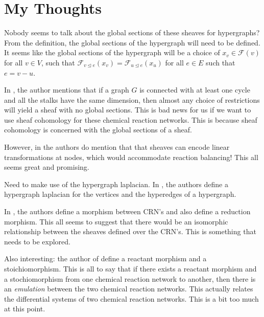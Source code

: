 \documentclass[12pt]{article}
\newcommand{\F}{\mathcal{F}}
\newcommand{\<}{\langle}
\renewcommand{\>}{\rangle}
\begin{document}
\section{My Thoughts}
Nobody seems to talk about the global sections of these sheaves for hypergraphs? 
From the definition, the global sections of the hypergraph will need to be defined.
It seems like the global sections of the hypergraph will be a choice of $x_v \in \F(v)$ for
all $v \in V$, such that $\F_{v \trianglelefteq e}(x_v) = \F_{u \trianglelefteq e}(x_u)$ for all
$e \in E$ such that $e = v - u$.

In \cite{jakobhansen}, the author mentions that if a graph $G$ is connected with at least one cycle
and all the stalks have the same dimension, then almost any choice of restrictions will yield a sheaf 
with no global sections. This is bad news for us if we want to use sheaf cohomology for these chemical
reaction networks. This is because sheaf cohomology is concerned with the global sections of a sheaf.

However, in \cite{flowsheaf} the authors do mention that that sheaves can encode linear transformations
at nodes, which would accommodate reaction balancing! This all seems great and promising.

Need to make use of the hypergraph laplacian. In \cite{jost2018hypergraph}, the authors define
a hypergraph laplacian for the vertices and the hyperedges of a hypergraph.

In \cite{Hirono2021}, the authors define a morphism between CRN's and also define a reduction
morphism. This all seems to suggest that there would be an isomorphic relationship between the
sheaves defined over the CRN's. This is something that needs to be explored.

Also interesting: the author of \cite{MorphismsReaction} define a reactant morphism and a 
stoichiomorphism. This is all to say that if there exists a reactant morphism and a stochiomorphism
from one chemical reaction network to another, then there is an \textit{emulation} between the two
chemical reaction networks. This actually relates the differential systems of two chemical reaction
networks. This is a bit too much at this point.




\end{document}
